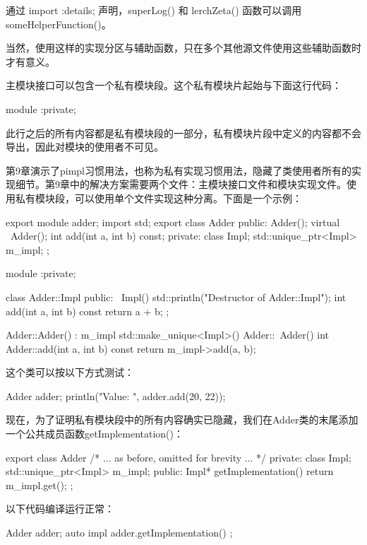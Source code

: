 通过 import :details; 声明，superLog() 和 lerchZeta() 函数可以调用 someHelperFunction()。

当然，使用这样的实现分区与辅助函数，只在多个其他源文件使用这些辅助函数时才有意义。


主模块接口可以包含一个私有模块段。这个私有模块片起始与下面这行代码：

\begin{cpp}
module :private;
\end{cpp}

此行之后的所有内容都是私有模块段的一部分，私有模块片段中定义的内容都不会导出，因此对模块的使用者不可见。

第9章演示了pimpl习惯用法，也称为私有实现习惯用法，隐藏了类使用者所有的实现细节。第9章中的解决方案需要两个文件：主模块接口文件和模块实现文件。使用私有模块段，可以使用单个文件实现这种分离。下面是一个示例：

\begin{cpp}
export module adder;
import std;
export class Adder
{
    public:
    Adder();
    virtual ~Adder();
    int add(int a, int b) const;
    private:
    class Impl;
    std::unique_ptr<Impl> m_impl;
};

module :private;

class Adder::Impl
{
    public:
    ~Impl() { std::println("Destructor of Adder::Impl"); }
    int add(int a, int b) const { return a + b;}
};

Adder::Adder() : m_impl { std::make_unique<Impl>() } { }
Adder::~Adder() {}
int Adder::add(int a, int b) const { return m_impl->add(a, b); }
\end{cpp}

这个类可以按以下方式测试：

\begin{cpp}
Adder adder;
println("Value: {}", adder.add(20, 22));
\end{cpp}

现在，为了证明私有模块段中的所有内容确实已隐藏，我们在Adder类的末尾添加一个公共成员函数getImplementation()：

\begin{cpp}
export class Adder
{
    /* ... as before, omitted for brevity ... */
    private:
        class Impl;
        std::unique_ptr<Impl> m_impl;
    public:
        Impl* getImplementation() { return m_impl.get(); }
};
\end{cpp}

以下代码编译运行正常：

\begin{cpp}
Adder adder;
auto impl { adder.getImplementation() };
\end{cpp}

